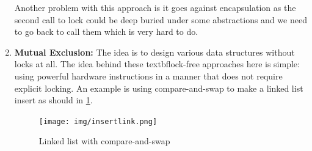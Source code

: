 \begin{enumerate}
        Another problem with this approach is it goes against encapsulation as
        the second call to lock could be deep buried under some abstractions 
        and we need to go back to call them which is very hard to do.

    \item \textbf{Mutual Exclusion:} The idea is to design various data 
        structures without locks at all. The idea behind these textbf{lock-free}
        approaches here is simple: using powerful hardware instructions
        in a manner that does not require explicit locking. An example is using
        compare-and-swap to make a linked list insert as should in \ref{insertlink}.

        \begin{figure}[h!]
            \label{insertlink}
            \begin{center}
                \texttt{[image: img/insertlink.png]}
                \caption{Linked list with compare-and-swap}
            \end{center}
        \end{figure}
\end{enumerate}
